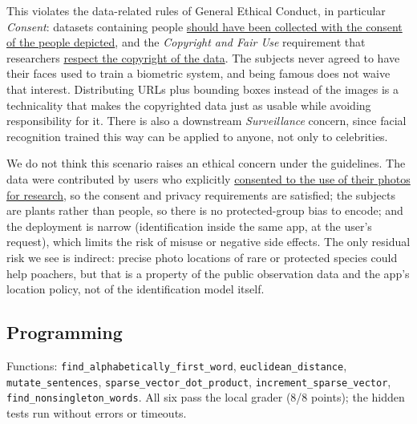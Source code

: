 \begin{solution}
This violates the data-related rules of General Ethical Conduct, in particular \emph{Consent}: datasets
containing people \uline{should have been collected with the consent of the people depicted}, and the
\emph{Copyright and Fair Use} requirement that researchers \uline{respect the copyright of the data}. The
subjects never agreed to have their faces used to train a biometric system, and being famous does not waive
that interest. Distributing URLs plus bounding boxes instead of the images is a technicality that makes the
copyrighted data just as usable while avoiding responsibility for it. There is also a downstream
\emph{Surveillance} concern, since facial recognition trained this way can be applied to anyone, not only to
celebrities.
\end{solution}

\begin{solution}
We do not think this scenario raises an ethical concern under the guidelines. The data were contributed by users
who explicitly \uline{consented to the use of their photos for research}, so the consent and privacy
requirements are satisfied; the subjects are plants rather than people, so there is no protected-group bias to
encode; and the deployment is narrow (identification inside the same app, at the user's request), which
limits the risk of misuse or negative side effects. The only residual risk we see is indirect: precise
photo locations of rare or protected species could help poachers, but that is a property of the public
observation data and the app's location policy, not of the identification model itself.
\end{solution}

\subsection{Programming}
Functions: \texttt{find\_alphabetically\_first\_word}, \texttt{euclidean\_distance},
\texttt{mutate\_sentences}, \texttt{sparse\_vector\_dot\_product}, \texttt{increment\_sparse\_vector},
\texttt{find\_nonsingleton\_words}. All six pass the local grader (8/8 points); the hidden tests run without
errors or timeouts.
